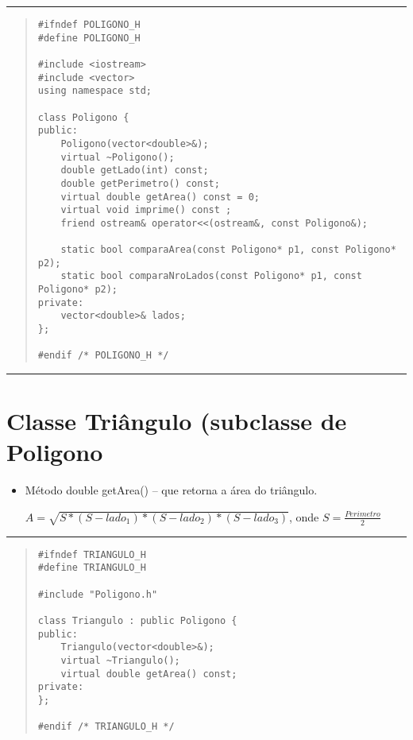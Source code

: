 \documentclass[12pt]{article}
\begin{document}
\par\noindent\rule{\textwidth}{0.4pt}

\begin{quote}
\begin{scriptsize}
\begin{verbatim}
#ifndef POLIGONO_H
#define POLIGONO_H

#include <iostream>
#include <vector>
using namespace std;

class Poligono {
public:
    Poligono(vector<double>&);
    virtual ~Poligono();
    double getLado(int) const;
    double getPerimetro() const;
    virtual double getArea() const = 0;
    virtual void imprime() const ;
    friend ostream& operator<<(ostream&, const Poligono&);

    static bool comparaArea(const Poligono* p1, const Poligono* p2);
    static bool comparaNroLados(const Poligono* p1, const Poligono* p2);
private:
    vector<double>& lados;
};

#endif /* POLIGONO_H */
\end{verbatim}
\end{scriptsize}
\end{quote}

\par\noindent\rule{\textwidth}{0.4pt}

\newpage

\section*{Classe {\sf Triângulo} (subclasse de {\sf Poligono}}

\begin{itemize}

\item Método {\sf double getArea()} -- que retorna a área do triângulo.

$A = \displaystyle\sqrt{S * (S - lado_1) * (S - lado_2) * (S - lado_3)}$, onde
$S=\displaystyle\frac{Perimetro}{2}$\\

\end{itemize}

\par\noindent\rule{\textwidth}{0.4pt}

\begin{quote}
\begin{scriptsize}
\begin{verbatim}
#ifndef TRIANGULO_H
#define TRIANGULO_H

#include "Poligono.h"

class Triangulo : public Poligono {
public:
    Triangulo(vector<double>&);
    virtual ~Triangulo();
    virtual double getArea() const;
private:
};

#endif /* TRIANGULO_H */
\end{verbatim}
\end{scriptsize}
\end{quote}
\end{document}
